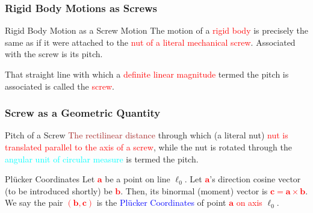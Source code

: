 \begin{frame}
	\frametitle{Rigid Body Motions as Screws}
	\begin{block}{Rigid Body Motion as a Screw Motion}
		The motion of a \textcolor{red}{rigid body} is precisely the same as if it were attached to  the \textcolor{red}{nut of a literal mechanical screw}. Associated with the screw is its pitch.
	\end{block}	
	\begin{definition}[Screw]
		That straight line with which a \textcolor{red}{definite linear magnitude} termed the pitch is associated is called the \textcolor{red}{screw}.
	\end{definition}
\end{frame}


\begin{frame}
	\frametitle{Screw as a Geometric Quantity}	
	\begin{block}{Pitch of a Screw}
		\textcolor{brown}{The rectilinear distance}  through which (a literal nut)  \textcolor{red}{nut is translated parallel to the axis of a screw}, while the nut is rotated through the \textcolor{cyan}{angular unit of circular measure} is termed the \textcolor{light-blue}{pitch}.
	\end{block}
	\begin{block}{Pl{\"u}cker Coordinates}
		Let \textcolor{red}{$\bm{a}$} be a point on line $\bm{\ell}_0$. Let \textcolor{red}{$\bm{a}$}'s direction cosine vector (to be introduced shortly) be \textcolor{red}{$\bm{b}$}. Then, its binormal (moment) vector is \textcolor{red}{$\bm{c=a\times b}$}. We say the pair \textcolor{red}{$(\bm{b},\bm{c})$} is the \textcolor{blue}{Pl{\"u}cker Coordinates} of point  \textcolor{red}{$\bm{a}$ on axis} $\bm{\ell}_0$.
	\end{block}	
\end{frame}

